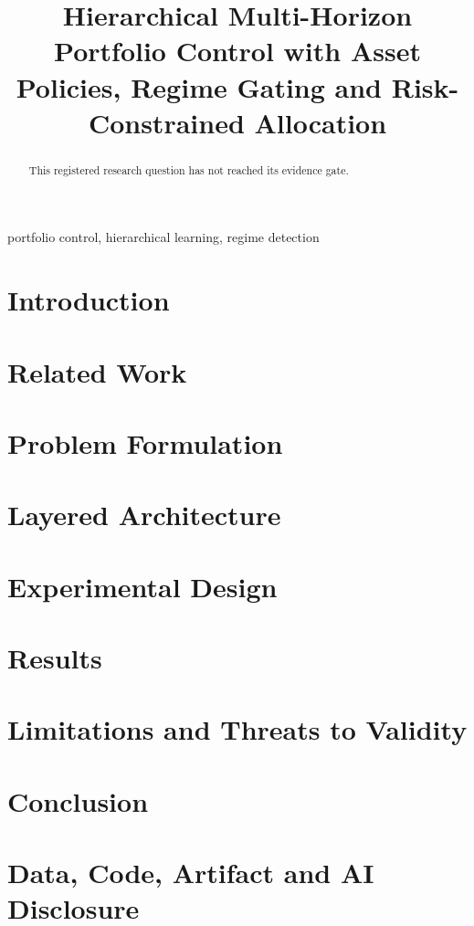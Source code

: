 \documentclass[conference]{IEEEtran}
\title{Hierarchical Multi-Horizon Portfolio Control with Asset Policies, Regime Gating and Risk-Constrained Allocation}
\author{\IEEEauthorblockN{Harvey}}
\begin{document}
\maketitle
\begin{abstract}
This registered research question has not reached its evidence gate.
\end{abstract}
\begin{IEEEkeywords}
portfolio control, hierarchical learning, regime detection
\end{IEEEkeywords}
\section{Introduction}
\section{Related Work}
\section{Problem Formulation}
\section{Layered Architecture}
\section{Experimental Design}
\section{Results}
\section{Limitations and Threats to Validity}
\section{Conclusion}
\section*{Data, Code, Artifact and AI Disclosure}


\end{document}
